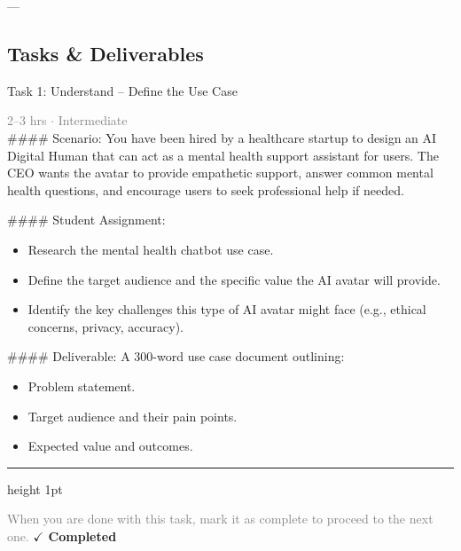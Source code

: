 \documentclass[10pt,a4paper]{article}
\begin{document}
---

\subsection*{Tasks \& Deliverables}

\begin{taskbox}{Task 1: Understand – Define the Use Case}

    {\small \textcolor{gray}{2--3 hrs $\cdot$ Intermediate}}\\[12pt]

    \#\#\#\# Scenario:  
You have been hired by a healthcare startup to design an AI Digital Human that can act as a mental health support assistant for users. The CEO wants the avatar to provide empathetic support, answer common mental health questions, and encourage users to seek professional help if needed.  

\#\#\#\# Student Assignment:  
\begin{itemize}
    \item Research the mental health chatbot use case.  
    \item Define the target audience and the specific value the AI avatar will provide.  
    \item Identify the key challenges this type of AI avatar might face (e.g., ethical concerns, privacy, accuracy).  
\end{itemize}

\#\#\#\# Deliverable:  
A 300-word use case document outlining:  
\begin{itemize}
    \item Problem statement.  
    \item Target audience and their pain points.  
    \item Expected value and outcomes.\par
\end{itemize}

    \vspace{16pt}

    \textcolor{cardBorder}{\hrule height 1pt}\vspace{8pt}

    \small \textcolor{gray}{When you are done with this task, mark it as complete to proceed to the next one.} \hfill \textbf{\textcolor{brandDark}{$\checkmark$ Completed}}

\end{taskbox}
\end{document}
